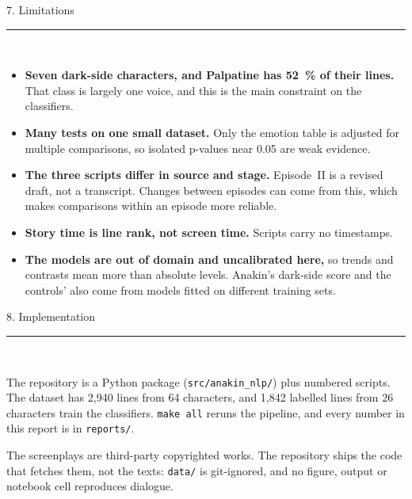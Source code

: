 \documentclass[11pt,a4paper]{article}
\newcommand{\heading}[1]{%
  \penalty-150\vspace{1.5em}%
  {\headingfont\fontsize{13.5}{16}\selectfont\color{ink}#1}\\[0.35em]%
  {\color{rule}\rule{\linewidth}{0.7pt}}\\[0.15em]%
  \nopagebreak}
\begin{document}
\heading{7. Limitations}

\begin{itemize}
\setlength\itemsep{0.15em}
\item \textbf{Seven dark-side characters, and Palpatine has 52~\% of their lines.} That class is
      largely one voice, and this is the main constraint on the classifiers.
\item \textbf{Many tests on one small dataset.} Only the emotion table is adjusted for multiple
      comparisons, so isolated p-values near 0.05 are weak evidence.
\item \textbf{The three scripts differ in source and stage.} Episode~II is a revised draft, not a
      transcript. Changes between episodes can come from this, which makes comparisons within an
      episode more reliable.
\item \textbf{Story time is line rank, not screen time.} Scripts carry no timestamps.
\item \textbf{The models are out of domain and uncalibrated here,} so trends and contrasts mean more
      than absolute levels. Anakin's dark-side score and the controls' also come from models fitted
      on different training sets.
\end{itemize}

\heading{8. Implementation}

The repository is a Python package (\texttt{src/anakin\_nlp/}) plus numbered scripts. The dataset has
2,940 lines from 64 characters, and 1,842 labelled lines from 26 characters train the classifiers.
\texttt{make all} reruns the pipeline, and every number in this report is in \texttt{reports/}.

The screenplays are third-party copyrighted works. The repository ships the code that fetches them,
not the texts: \texttt{data/} is git-ignored, and no figure, output or notebook cell reproduces
dialogue.
\end{document}
